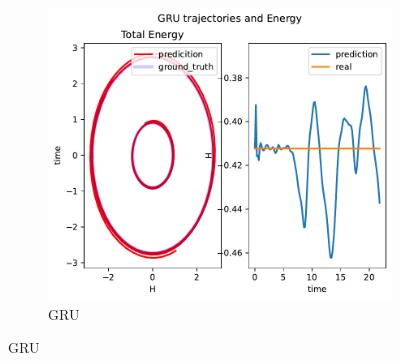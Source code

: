 \begin{figure}[H]
	\hfill
	\begin{subfigure}[b]{0.3\textwidth}
		\centering
		\includegraphics[width=\textwidth]{chapters/chapter5/body2_gru_traj.pdf}
		\caption{GRU}
	\end{subfigure}
	
	\vspace{0.5cm} %
	

\end{figure}
